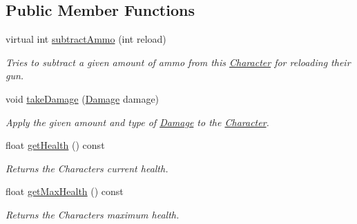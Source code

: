 \subsection*{Public Member Functions}
\begin{DoxyCompactItemize}
\item 
virtual int \mbox{\hyperlink{class_character_a0b36bcc9509ec1e5d7b6902675edc8f2}{subtract\+Ammo}} (int reload)
\begin{DoxyCompactList}\small\item\em Tries to subtract a given amount of ammo from this \mbox{\hyperlink{class_character}{Character}} for reloading their gun. \end{DoxyCompactList}\item 
void \mbox{\hyperlink{class_character_a3576c31fdd469e24ba63002dc998c352}{take\+Damage}} (\mbox{\hyperlink{struct_damage}{Damage}} damage)
\begin{DoxyCompactList}\small\item\em Apply the given amount and type of \mbox{\hyperlink{struct_damage}{Damage}} to the \mbox{\hyperlink{class_character}{Character}}. \end{DoxyCompactList}\item 
\mbox{\label{class_character_a95956c07e76d58a0122d454fb372a990}} 
float \mbox{\hyperlink{class_character_a95956c07e76d58a0122d454fb372a990}{get\+Health}} () const
\begin{DoxyCompactList}\small\item\em Returns the Characters current health. \end{DoxyCompactList}\item 
\mbox{\label{class_character_a1177be9f36ec1281edb0fd54e93901a7}} 
float \mbox{\hyperlink{class_character_a1177be9f36ec1281edb0fd54e93901a7}{get\+Max\+Health}} () const
\begin{DoxyCompactList}\small\item\em Returns the Characters maximum health. \end{DoxyCompactList}\end{DoxyCompactItemize}
